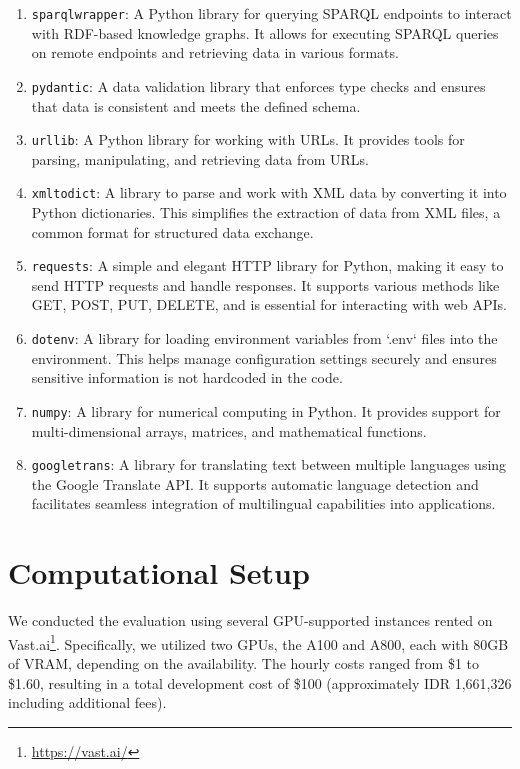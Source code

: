 \begin{enumerate}
    \item \texttt{sparqlwrapper}: A Python library for querying SPARQL endpoints to interact with RDF-based knowledge graphs. It allows for executing SPARQL queries on remote endpoints and retrieving data in various formats.
    \item \texttt{pydantic}: A data validation library that enforces type checks and ensures that data is consistent and meets the defined schema. 
    \item \texttt{urllib}: A Python library for working with URLs. It provides tools for parsing, manipulating, and retrieving data from URLs.
    \item \texttt{xmltodict}: A library to parse and work with XML data by converting it into Python dictionaries. This simplifies the extraction of data from XML files, a common format for structured data exchange.
    \item \texttt{requests}: A simple and elegant HTTP library for Python, making it easy to send HTTP requests and handle responses. It supports various methods like GET, POST, PUT, DELETE, and is essential for interacting with web APIs.
    \item \texttt{dotenv}: A library for loading environment variables from `.env` files into the environment. This helps manage configuration settings securely and ensures sensitive information is not hardcoded in the code.
    \item \texttt{numpy}: A library for numerical computing in Python. It provides support for multi-dimensional arrays, matrices, and mathematical functions.
    \item \texttt{googletrans}: A library for translating text between multiple languages using the Google Translate API. It supports automatic language detection and facilitates seamless integration of multilingual capabilities into applications.
\end{enumerate}


\section{Computational Setup}
We conducted the evaluation using several GPU-supported instances rented on Vast.ai\footnote{\url{https://vast.ai/}}. Specifically, we utilized two GPUs, the A100 and A800, each with 80GB of VRAM, depending on the availability. The hourly costs ranged from \$1 to \$1.60, resulting in a total development cost of \$100 (approximately IDR 1,661,326 including additional fees).


